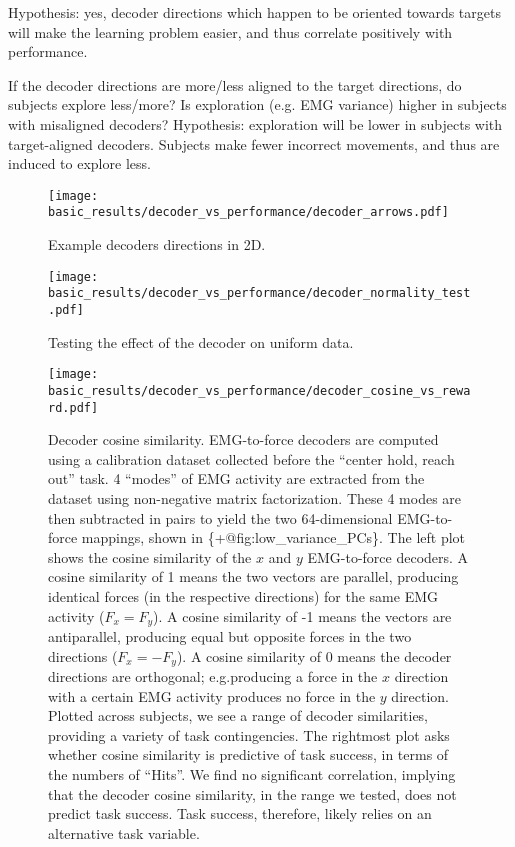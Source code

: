 \documentclass[../main.tex]{subfiles}
\begin{document}
    Hypothesis: yes, decoder directions which happen to be oriented towards targets will make the learning problem easier, and thus correlate positively with performance.

If the decoder directions are more/less aligned to the target directions, do subjects explore less/more? Is exploration (e.g. EMG variance) higher in subjects with misaligned decoders?
    Hypothesis: exploration will be lower in subjects with target-aligned decoders. Subjects make fewer incorrect movements, and thus are induced to explore less.

\begin{figure}[H]%
    \centering
    \texttt{[image: basic\_results/decoder\_vs\_performance/decoder\_arrows.pdf]}
    \caption[Example decoder directions in 2D.]{Example decoders directions in 2D.}\label{fig:decoder_arrows}
\end{figure}

\begin{figure}[H]%
    \centering
    \texttt{[image: basic\_results/decoder\_vs\_performance/decoder\_normality\_test.pdf]}
    \caption[Decoder normality testing]{Testing the effect of the decoder on uniform data.}\label{fig:decoder_normality}
\end{figure}

\begin{figure}[H]%
    \centering
    \texttt{[image: basic\_results/decoder\_vs\_performance/decoder\_cosine\_vs\_reward.pdf]}
    \caption[Decoder axis similarity versus reward]{Decoder cosine similarity. EMG-to-force decoders are computed using a calibration dataset collected before the ``center hold, reach out'' task. 4 ``modes'' of EMG activity are extracted from the dataset using non-negative matrix factorization. These 4 modes are then subtracted in pairs to yield the two 64-dimensional EMG-to-force mappings, shown in \{+@fig:low\_variance\_PCs\}. The left plot shows the cosine similarity of the $x$ and $y$ EMG-to-force decoders. A cosine similarity of 1 means the two vectors are parallel, producing identical forces (in the respective directions) for the same EMG activity ($F_x = F_y$). A cosine similarity of -1 means the vectors are antiparallel, producing equal but opposite forces in the two directions ($F_x = -F_y$). A cosine similarity of 0 means the decoder directions are orthogonal; e.g.producing a force in the $x$ direction with a certain EMG activity produces no force in the $y$ direction. Plotted across subjects, we see a range of decoder similarities, providing a variety of task contingencies. The rightmost plot asks whether cosine similarity is predictive of task success, in terms of the numbers of ``Hits''. We find no significant correlation, implying that the decoder cosine similarity, in the range we tested, does not predict task success. Task success, therefore, likely relies on an alternative task variable.}\label{fig:decoder_cosine_vs_reward}
\end{figure}
\end{document}
